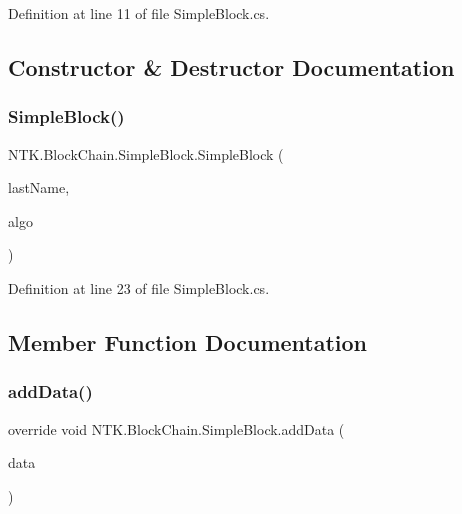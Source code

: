 Definition at line 11 of file Simple\+Block.\+cs.



\subsection{Constructor \& Destructor Documentation}
\mbox{\label{class_n_t_k_1_1_block_chain_1_1_simple_block_a65295f9c0c7b146f4a84b85f5fef93f5}} 
\subsubsection{\texorpdfstring{SimpleBlock()}{SimpleBlock()}}
{\footnotesize\ttfamily N\+T\+K.\+Block\+Chain.\+Simple\+Block.\+Simple\+Block (\begin{DoxyParamCaption}\item[{string}]{last\+Name,  }\item[{\mbox{\hyperlink{interface_n_t_k_1_1_security_1_1_i_hash}{I\+Hash}}}]{algo }\end{DoxyParamCaption})}



Definition at line 23 of file Simple\+Block.\+cs.



\subsection{Member Function Documentation}
\mbox{\label{class_n_t_k_1_1_block_chain_1_1_simple_block_a304b9158060f12176e866aef165d2fa3}} 
\subsubsection{\texorpdfstring{addData()}{addData()}}
{\footnotesize\ttfamily override void N\+T\+K.\+Block\+Chain.\+Simple\+Block.\+add\+Data (\begin{DoxyParamCaption}\item[{string}]{data }\end{DoxyParamCaption})}



